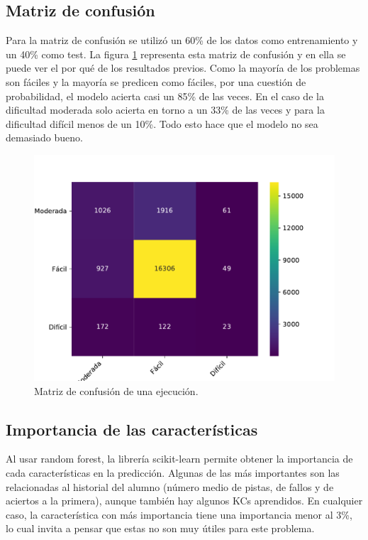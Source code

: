 \documentclass[acmtog, screen]{acmart}
\begin{document}
\subsection{Matriz de confusión}
Para la matriz de confusión se utilizó un 60\% de los datos como entrenamiento y un 40\% como test. La figura \ref{fig:cm} representa esta matriz de confusión y en ella se puede ver el por qué de los resultados previos. Como la mayoría de los problemas son fáciles y la mayoría se predicen como fáciles, por una cuestión de probabilidad, el modelo acierta casi un 85\% de las veces. En el caso de la dificultad moderada solo acierta en torno a un 33\% de las veces y para la dificultad difícil menos de un 10\%. Todo esto hace que el modelo no sea demasiado bueno.

\begin{figure}
	\centering
	\includegraphics[width=\columnwidth]{cm}
	\caption{Matriz de confusión de una ejecución.}
	\label{fig:cm}
\end{figure}

\subsection{Importancia de las características}
Al usar random forest, la librería scikit-learn permite obtener la importancia de cada características en la predicción. Algunas de las más importantes son las relacionadas al historial del alumno (número medio de pistas, de fallos y de aciertos a la primera), aunque también hay algunos KCs aprendidos. En cualquier caso, la característica con más importancia tiene una importancia menor al 3\%, lo cual invita a pensar que estas no son muy útiles para este problema.
\end{document}

